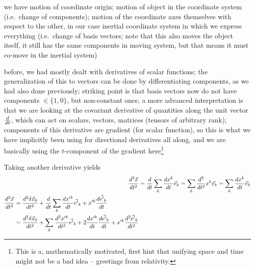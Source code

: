 \documentclass[../class_mech_main.tex]{subfiles}
\begin{document}

we have motion of coordinate origin; motion of object in the coordinate system (i.e.~change of components); motion of the coordinate axes themselves with respect to the other, in our case inertial coordinate system in which we express everything (i.e.~change of basis vectors; note that this also moves the object itself, it still has the same components in moving system, but that means it must co-move in the inertial system)



before, we had mostly dealt with derivatives of scalar functions; the generalization of this to vectors can be done by differentiating components, as we had also done previously; striking point is that basis vectors now do not have components $\in \{1, 0\}$, but non-constant ones; a more advanced interpretation is that we are looking at the covariant derivative of quantities along the unit vector $\dv{t}$, which can act on scalars, vectors, matrices (tensors of arbitrary rank); components of this derivative are gradient (for scalar function), so this is what we have implicitly been using for directional derivatives all along, and we are basically using the $t$-component of the gradient here\footnote{This is a, mathematically motivated, first hint that unifying space and time might not be a bad idea -- greetings from relativity.}



Taking another derivative yields
\begin{align}
    \dv[2]{\vec{x}}{t} &= \dv{t} \sum_k \dv{x^k}{t} \vec{e}_k = \sum_k \dv[2]{t} x^k \vec{e}_k = \sum_k \dv{x^k}{t} \vec{e}_k
    \\
	\begin{split}
		\dv[2]{\vec{x}}{t} &= \dv[2]{\delta \vec{x}_0}{t} + \dv{t} \sum_k \dv{x'^k}{t} \vec{e'}_k + x'^k \dv{\vec{e'}_k}{t}
		\\
		&= \dv[2]{\delta \vec{x}_0}{t} + \sum_k \dv[2]{x'^k}{t} \vec{e'}_k + 2 \dv{x'^k}{t} \dv{\vec{e'}_k}{t} + x'^k \dv[2]{\vec{e'}_k}{t}
	\end{split}
    \label{eq:acceleration_accel_frame}
\end{align}
\end{document}
